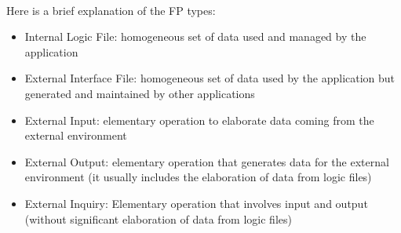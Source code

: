 \documentclass[a4paper,11pt]{report} %
\begin{document}
			\bigskip\\
			Here is a brief explanation of the FP types:
			\begin{itemize}
				\item Internal Logic File: homogeneous set of data used and managed by the application
				\item External Interface File: homogeneous set of data used by the application but generated and maintained by other applications
				\item External Input: elementary operation to elaborate data coming from the external environment
				\item External Output: elementary operation that generates data for the external environment (it usually includes the elaboration of data from logic files)
				\item External Inquiry: Elementary operation that involves input and output (without significant elaboration of data from logic files)
				
			\end{itemize}
	
\end{document}
